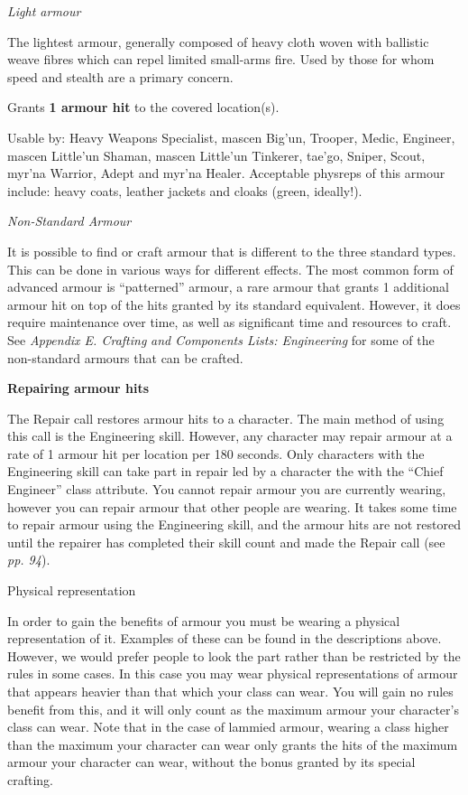 \textit{Light armour}

The lightest armour, generally composed of heavy cloth woven with ballistic weave fibres which can repel limited small-arms fire. Used by those for whom speed and stealth are a primary concern.

Grants \textbf{1 armour hit} to the covered location(s).

Usable by: Heavy Weapons Specialist, mascen Big'un, Trooper, Medic, Engineer, mascen Little'un Shaman, mascen Little'un Tinkerer, tae'go, Sniper, Scout, myr'na Warrior, Adept and myr'na Healer. Acceptable physreps of this armour include: heavy coats, leather jackets and cloaks (green, ideally!).

\textit{Non-Standard Armour}

It is possible to find or craft armour that is different to the three standard types. This can be done in various ways for different effects. The most common form of advanced armour is ``patterned'' armour, a rare armour that grants 1 additional armour hit on top of the hits granted by its standard equivalent. However, it does require maintenance over time, as well as significant time and resources to craft. See \textit{Appendix E. Crafting} \textit{and Components Lists: Engineering} for some of the non-standard armours that can be crafted.

\textbf{Repairing armour hits}

The Repair call restores armour hits to a character. The main method of using this call is the Engineering skill. However, any character may repair armour at a rate of 1 armour hit per location per 180 seconds. Only characters with the Engineering skill can take part in repair led by a character the with the ``Chief Engineer'' class attribute. You cannot repair armour you are currently wearing, however you can repair armour that other people are wearing. It takes some time to repair armour using the Engineering skill, and the armour hits are not restored until the repairer has completed their skill count and made the Repair call (see \textit{pp. 94}).

Physical representation

In order to gain the benefits of armour you must be wearing a physical representation of it. Examples of these can be found in the descriptions above. However, we would prefer people to look the part rather than be restricted by the rules in some cases. In this case you may wear physical representations of armour that appears heavier than that which your class can wear. You will gain no rules benefit from this, and it will only count as the maximum armour your character's class can wear. Note that in the case of lammied armour, wearing a class higher than the maximum your character can wear only grants the hits of the maximum armour your character can wear, without the bonus granted by its special crafting.

